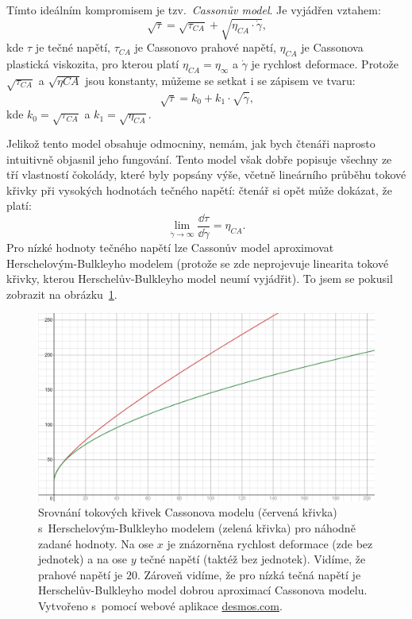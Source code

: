 \documentclass[12pt]{article}
\begin{document}
Tímto ideálním kompromisem je tzv.~\emph{Cassonův model}. Je vyjádřen vztahem:~\cite{Article:Comparison_of_models_chocolate}\cite{Article:Determination_of_chocolate_viscosity}\cite{Article:Extended_casson_equation}\cite{Article:Flow_properties_molten_chocolate}
\begin{equation}
    \sqrt{\tau} = \sqrt{\tau_{CA}} + \sqrt{\eta_{CA}\cdot\dot\gamma}\text{,}
    \label{eq:Casson_model}
\end{equation}
kde $\tau$ je tečné napětí, $\tau_{CA}$ je Cassonovo prahové napětí, $\eta_{CA}$ je Cassonova plastická viskozita, pro kterou platí $\eta_{CA} = \eta_\infty$ a $\dot\gamma$ je rychlost deformace. Protože $\sqrt{\tau_{CA}}$ a $\sqrt{\eta{CA}}$ jsou konstanty, můžeme se setkat i se zápisem ve tvaru:~\cite{Article:Rapid_and_economic_chocolate_viscosity}
\begin{equation}
    \sqrt{\tau} = k_0 + k_1\cdot\sqrt{\dot\gamma}\text{,}
\end{equation}
kde $k_0 = \sqrt{\tau_{CA}}$ a $k_1 = \sqrt{\eta_{CA}}$.
\par\noindent
Jelikož tento model obsahuje odmocniny, nemám, jak bych čtenáři naprosto intuitivně objasnil jeho fungování. Tento model však dobře popisuje všechny ze tří vlastností čokolády, které byly popsány výše, včetně lineárního průběhu tokové křivky při vysokých hodnotách tečného napětí: čtenář si opět může dokázat, že platí:
\begin{equation}
    \lim_{\dot\gamma\to\infty} \frac{\dd\tau}{\dd\dot\gamma} = \eta_{CA}\text{.}
\end{equation}
Pro nízké hodnoty tečného napětí lze Cassonův model aproximovat Herschelovým-Bulkleyho modelem (protože se zde neprojevuje linearita tokové křivky, kterou Herschelův-Bulkleyho model neumí vyjádřit). To jsem se pokusil zobrazit na obrázku~\ref{fig:Casson_vs_Herschel}.
\begin{figure}
    \centering
    \includegraphics[width=\linewidth]{figures/Casson vs Herschel.png}
    \caption{Srovnání tokových křivek Cassonova modelu (červená křivka) s~Herschelovým-Bulkleyho modelem (zelená křivka) pro náhodně zadané hodnoty. Na ose $x$ je znázorněna rychlost deformace (zde bez jednotek) a na ose $y$ tečné napětí (taktéž bez jednotek). Vidíme, že prahové napětí je $20$. Zároveň vidíme, že pro nízká tečná napětí je Herschelův-Bulkleyho model dobrou aproximací Cassonova modelu. Vytvořeno s~pomocí webové aplikace \url{desmos.com}.}
    \label{fig:Casson_vs_Herschel}
\end{figure}
\end{document}
